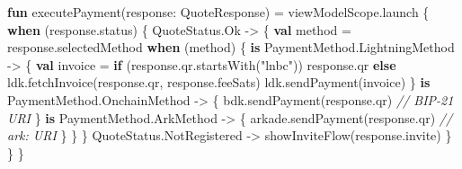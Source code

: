 \documentclass[
]{article}
\newenvironment{Shaded}{}{}
\newcommand{\CommentTok}[1]{\textcolor[rgb]{0.38,0.63,0.69}{\textit{#1}}}
\newcommand{\ControlFlowTok}[1]{\textcolor[rgb]{0.00,0.44,0.13}{\textbf{#1}}}
\newcommand{\DataTypeTok}[1]{\textcolor[rgb]{0.56,0.13,0.00}{#1}}
\newcommand{\FunctionTok}[1]{\textcolor[rgb]{0.02,0.16,0.49}{#1}}
\newcommand{\KeywordTok}[1]{\textcolor[rgb]{0.00,0.44,0.13}{\textbf{#1}}}
\newcommand{\NormalTok}[1]{#1}
\newcommand{\OperatorTok}[1]{\textcolor[rgb]{0.40,0.40,0.40}{#1}}
\newcommand{\StringTok}[1]{\textcolor[rgb]{0.25,0.44,0.63}{#1}}
\newcommand{\VariableTok}[1]{\textcolor[rgb]{0.10,0.09,0.49}{#1}}
\begin{document}
\begin{Shaded}
\begin{Highlighting}[]
    \KeywordTok{fun} \FunctionTok{executePayment}\OperatorTok{(}\VariableTok{response}\OperatorTok{:} \DataTypeTok{QuoteResponse}\OperatorTok{)} \OperatorTok{=}\NormalTok{ viewModelScope}\OperatorTok{.}\NormalTok{launch }\OperatorTok{\{}
        \ControlFlowTok{when} \OperatorTok{(}\NormalTok{response}\OperatorTok{.}\NormalTok{status}\OperatorTok{)} \OperatorTok{\{}
\NormalTok{            QuoteStatus}\OperatorTok{.}\NormalTok{Ok }\OperatorTok{{-}\textgreater{}} \OperatorTok{\{}
                \KeywordTok{val} \VariableTok{method} \OperatorTok{=}\NormalTok{ response}\OperatorTok{.}\NormalTok{selectedMethod}
                \ControlFlowTok{when} \OperatorTok{(}\NormalTok{method}\OperatorTok{)} \OperatorTok{\{}
                    \KeywordTok{is}\NormalTok{ PaymentMethod}\OperatorTok{.}\NormalTok{LightningMethod }\OperatorTok{{-}\textgreater{}} \OperatorTok{\{}
                        \KeywordTok{val} \VariableTok{invoice} \OperatorTok{=} \ControlFlowTok{if} \OperatorTok{(}\NormalTok{response}\OperatorTok{.}\NormalTok{qr}\OperatorTok{.}\NormalTok{startsWith}\OperatorTok{(}\StringTok{"lnbc"}\OperatorTok{))}\NormalTok{ response}\OperatorTok{.}\NormalTok{qr}
                            \ControlFlowTok{else}\NormalTok{ ldk}\OperatorTok{.}\NormalTok{fetchInvoice}\OperatorTok{(}\NormalTok{response}\OperatorTok{.}\NormalTok{qr}\OperatorTok{,}\NormalTok{ response}\OperatorTok{.}\NormalTok{feeSats}\OperatorTok{)}
\NormalTok{                        ldk}\OperatorTok{.}\NormalTok{sendPayment}\OperatorTok{(}\NormalTok{invoice}\OperatorTok{)}
                    \OperatorTok{\}}
                    \KeywordTok{is}\NormalTok{ PaymentMethod}\OperatorTok{.}\NormalTok{OnchainMethod }\OperatorTok{{-}\textgreater{}} \OperatorTok{\{}
\NormalTok{                        bdk}\OperatorTok{.}\NormalTok{sendPayment}\OperatorTok{(}\NormalTok{response}\OperatorTok{.}\NormalTok{qr}\OperatorTok{)}  \CommentTok{// BIP{-}21 URI}
                    \OperatorTok{\}}
                    \KeywordTok{is}\NormalTok{ PaymentMethod}\OperatorTok{.}\NormalTok{ArkMethod }\OperatorTok{{-}\textgreater{}} \OperatorTok{\{}
\NormalTok{                        arkade}\OperatorTok{.}\NormalTok{sendPayment}\OperatorTok{(}\NormalTok{response}\OperatorTok{.}\NormalTok{qr}\OperatorTok{)}  \CommentTok{// ark: URI}
                    \OperatorTok{\}}
                \OperatorTok{\}}
            \OperatorTok{\}}
\NormalTok{            QuoteStatus}\OperatorTok{.}\NormalTok{NotRegistered }\OperatorTok{{-}\textgreater{}}\NormalTok{ showInviteFlow}\OperatorTok{(}\NormalTok{response}\OperatorTok{.}\NormalTok{invite}\OperatorTok{)}
        \OperatorTok{\}}
    \OperatorTok{\}}
\OperatorTok{\}}
\end{Highlighting}
\end{Shaded}
\end{document}

